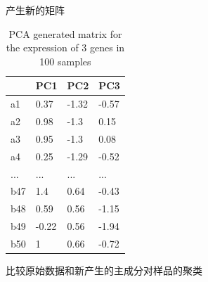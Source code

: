 \documentclass[]{article}
\newenvironment{Shaded}{\begin{snugshade}}{\end{snugshade}}
\newcommand{\KeywordTok}[1]{\textcolor[rgb]{0.13,0.29,0.53}{\textbf{{#1}}}}
\newcommand{\DataTypeTok}[1]{\textcolor[rgb]{0.13,0.29,0.53}{{#1}}}
\newcommand{\DecValTok}[1]{\textcolor[rgb]{0.00,0.00,0.81}{{#1}}}
\newcommand{\StringTok}[1]{\textcolor[rgb]{0.31,0.60,0.02}{{#1}}}
\newcommand{\NormalTok}[1]{{#1}}
\numberwithin{figure}{section}
\numberwithin{table}{section}
\theoremstyle{definition}
\theoremstyle{definition}
\theoremstyle{definition}
\theoremstyle{remark}
\begin{document}
产生新的矩阵

\begin{Shaded}
\end{Shaded}

\begin{table}

\caption{\label{tab:newdata3}PCA generated matrix for the expression of 3 genes in 100 samples}
\centering
\begin{tabular}[t]{llll}
\toprule
  & PC1 & PC2 & PC3\\
\midrule
a1 & 0.37 & -1.32 & -0.57\\
a2 & 0.98 & -1.3 & 0.15\\
a3 & 0.95 & -1.3 & 0.08\\
a4 & 0.25 & -1.29 & -0.52\\
... & ... & ... & ...\\
\addlinespace
b47 & 1.4 & 0.64 & -0.43\\
b48 & 0.59 & 0.56 & -1.15\\
b49 & -0.22 & 0.56 & -1.94\\
b50 & 1 & 0.66 & -0.72\\
\bottomrule
\end{tabular}
\end{table}

比较原始数据和新产生的主成分对样品的聚类
\end{document}
